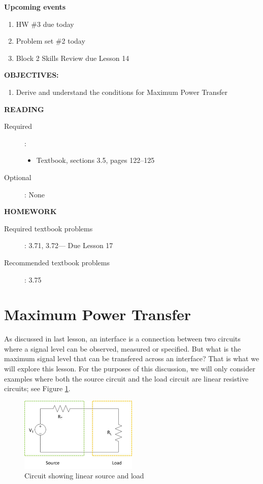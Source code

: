 \documentclass{handout}
\begin{document}
\maketitle

\textbf{Upcoming events}
\begin{enumerate}
\item HW \#3 due today
\item Problem set \#2 today
\item Block 2 Skills Review due Lesson 14
\end{enumerate}

\textbf{OBJECTIVES:}
\begin{enumerate}
\item Derive and understand the conditions for Maximum Power Transfer
\end{enumerate}

\textbf{READING}
\begin{description}
\item [Required]:
\begin{itemize}
\item  Textbook, sections 3.5, pages 122--125
\end{itemize}
\item [Optional]: None
\end{description}

\textbf{HOMEWORK}
\begin{description}
\item [Required textbook problems]: 3.71, 3.72--- Due Lesson 17
\item [Recommended textbook problems]: 3.75
\end{description}

\section{Maximum Power Transfer}
As discussed in last lesson, an interface is a connection between two circuits where a signal level can be observed, measured or specified.  But what is the maximum signal level that can be transfered across an interface?  That is what we will explore this lesson.  For the purposes of this discussion, we will only consider examples where both the source circuit and the load circuit are linear resistive circuits; see Figure \ref{fig: Source_Load}.
\begin{figure} [h t b]
\centering
\includegraphics[width=0.5\textwidth]{Source_Load.jpg}
\caption{Circuit showing linear source and load}
\label{fig: Source_Load}
\end{figure}
\end{document}
